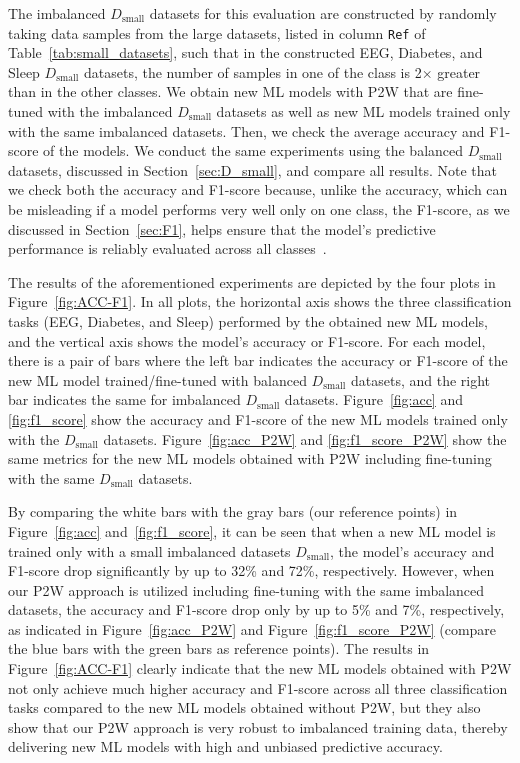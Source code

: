 \documentclass[letterpaper]{article}
\begin{document}
The imbalanced $D_\text{small}$ datasets for this evaluation are constructed by randomly taking data samples from the large datasets, listed in column \texttt{Ref} of Table~\ref{tab:small_datasets}, such that in the constructed EEG, Diabetes, and Sleep $D_\text{small}$ datasets, the number of samples in one of the class is 2$\times$ greater than in the other classes. We obtain new ML models with P2W that are fine-tuned with the imbalanced $D_\text{small}$ datasets as well as new ML models trained only with the same imbalanced datasets. Then, we check the average accuracy and F1-score of the models. We conduct the same experiments using the balanced $D_\text{small}$ datasets, discussed in Section~\ref{sec:D_small}, and compare all results. Note that we check both the accuracy and F1-score because, unlike the accuracy, which can be misleading if a model performs very well only on one class, the F1-score, as we discussed in Section~\ref{sec:F1}, helps ensure that the model’s predictive performance is reliably evaluated across all classes~\cite{10.1007/11941439_114}. 

The results of the aforementioned experiments are depicted by the four plots in Figure~\ref{fig:ACC-F1}. In all plots, the horizontal axis shows the three classification tasks (EEG, Diabetes, and Sleep) performed by the obtained new ML models, and the vertical axis shows the model's accuracy or F1-score. For each model, there is a pair of bars where the left bar indicates the accuracy or F1-score of the new ML model trained/fine-tuned with balanced $D_\text{small}$ datasets, and the right bar indicates the same for imbalanced $D_\text{small}$ datasets.
Figure~\ref{fig:acc} and \ref{fig:f1_score} show the accuracy and F1-score of the new ML models trained only with the $D_\text{small}$ datasets. Figure~\ref{fig:acc_P2W} and \ref{fig:f1_score_P2W} show the same metrics for the new ML models obtained with P2W including fine-tuning with the same $D_\text{small}$ datasets.

By comparing the white bars with the gray bars (our reference points) in  Figure~\ref{fig:acc} and~\ref{fig:f1_score}, it can be seen that when a new ML model is trained only with a small imbalanced datasets $D_\text{small}$, the model's accuracy and F1-score drop significantly by up to 32\% and 72\%, respectively. However, when our P2W approach is utilized including fine-tuning with the same imbalanced datasets, the accuracy and F1-score drop only by up to 5\% and 7\%, respectively, as indicated in Figure~\ref{fig:acc_P2W} and Figure~\ref{fig:f1_score_P2W} (compare the blue bars with the green bars as reference points).
The results in Figure~\ref{fig:ACC-F1} clearly indicate that the new ML models obtained with P2W not only achieve much higher accuracy and F1-score across all three classification tasks compared to the new ML models obtained without P2W, but they also show that our P2W approach is very robust to imbalanced training data, thereby delivering new ML models with high and unbiased predictive accuracy.
\end{document}
